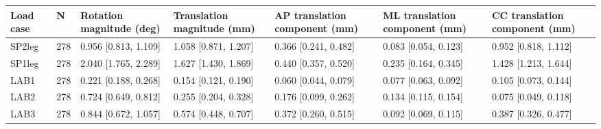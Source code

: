 \begin{tabular}{lllllll}
\toprule
Load case & N & Rotation magnitude (deg) & Translation magnitude (mm) & AP translation component (mm) & ML translation component (mm) & CC translation component (mm) \\
\midrule
SP2leg & 278 & 0.956 [0.813, 1.109] & 1.058 [0.871, 1.207] & 0.366 [0.241, 0.482] & 0.083 [0.054, 0.123] & 0.952 [0.818, 1.112] \\
SP1leg & 278 & 2.040 [1.765, 2.289] & 1.627 [1.430, 1.869] & 0.440 [0.357, 0.520] & 0.235 [0.164, 0.345] & 1.428 [1.213, 1.644] \\
LAB1 & 278 & 0.221 [0.188, 0.268] & 0.154 [0.121, 0.190] & 0.060 [0.044, 0.079] & 0.077 [0.063, 0.092] & 0.105 [0.073, 0.144] \\
LAB2 & 278 & 0.724 [0.649, 0.812] & 0.255 [0.204, 0.328] & 0.176 [0.099, 0.262] & 0.134 [0.115, 0.154] & 0.075 [0.049, 0.118] \\
LAB3 & 278 & 0.844 [0.672, 1.057] & 0.574 [0.448, 0.707] & 0.372 [0.260, 0.515] & 0.092 [0.069, 0.115] & 0.387 [0.326, 0.477] \\
\bottomrule
\end{tabular}
